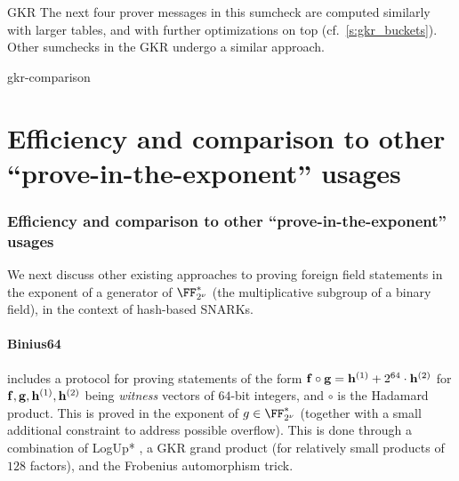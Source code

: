 \begin{lncsmove}{GKR}
The next four prover messages in this sumcheck are computed similarly with larger tables, and with further optimizations on top (cf.\ \cref{s:gkr_buckets}). Other sumchecks in the GKR undergo a similar approach.




      





\end{lncsmove}
\begin{lncsappendix}{gkr-comparison}
\iflncs\section{Efficiency and comparison to other ``prove-in-the-exponent'' usages}\else\subsubsection{Efficiency and comparison to other ``prove-in-the-exponent'' usages}\fi\label{r:comparison_grand_product_binius_lev}


We next discuss other existing approaches to proving foreign field statements in the exponent of a generator of $\comfield^*$ (the multiplicative subgroup of a binary field), in the context of hash-based SNARKs. 

   
        
        
        
        
      
        



        
              \paragraph{Binius64} \cite{binius64} includes a protocol for proving statements of the form $\mathbf{f} \circ \mathbf{g} = \mathbf{h}^{(1)} + 2^{64}\cdot \mathbf{h}^{(2)}$ for $\mathbf{f},\mathbf{g},\mathbf{h}^{(1)}, \mathbf{h}^{(2)}$ being \emph{witness} vectors of $64$-bit integers, and $\circ$ is the Hadamard product. This is proved  in the exponent of $g\in \comfield^*$ (together with a small additional constraint to address possible overflow). This is done through a combination of LogUp* \cite{logupstar}, a GKR grand product (for relatively small products of $128$ factors), and the Frobenius automorphism trick. 
        

\end{lncsappendix}
